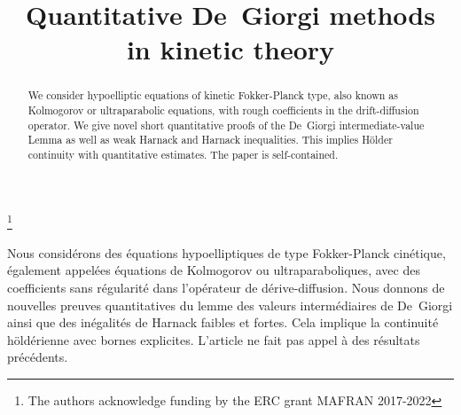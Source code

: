 \documentclass[JEP,XML,SOM,Unicode,NoFloatCountersInSection,published]{cedram}
\theoremstyle{definition}
\theoremstyle{remark}
\begin{document}
\frontmatter

\title[Quantitative De~Giorgi methods in kinetic
theory]{Quantitative De~Giorgi methods\\ in kinetic theory}

\author[\initial{J.} \lastname{Guerand}]{ }
\address{Université de Montpellier, IMAG\\
499-554 rue du Truel, 34090 Montpellier, France}

\author[\initial{C.} \lastname{Mouhot}]{ }
\address{University of Cambridge, Department of
Pure Mathematics and Mathematical Statistics\\
Wilberforce Road,
Cambridge CB3 0WA, United Kingdom}

\thanks{The authors acknowledge funding by the ERC grant MAFRAN 2017-2022}

\begin{abstract}
We consider hypoelliptic equations of kinetic Fokker-Planck type, also known as Kolmogorov or ultraparabolic equations, with rough coefficients in the drift-diffusion operator. We give novel short quantitative proofs of the De~Giorgi intermediate-value Lemma as well as weak Harnack and Harnack inequalities. This implies Hölder continuity with quantitative estimates. The paper is self-contained.
\end{abstract}





\begin{altabstract}
Nous considérons des équations hypoelliptiques de type Fokker-Planck cinétique, également appelées équations de Kolmogorov ou ultraparaboliques, avec des coefficients sans régularité dans l'opérateur de dérive-diffusion. Nous donnons de nouvelles preuves quantitatives du lemme des valeurs inter\-médiaires de De~Giorgi ainsi que des inégalités de Harnack faibles et fortes. Cela implique la continuité höldérienne avec bornes explicites. L'article ne fait pas appel à des résultats précédents.\end{altabstract}
\end{document}
